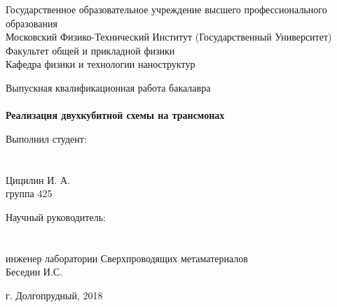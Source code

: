 \documentclass[12pt, a4paper, openany]{book}
\begin{document}
\begin{titlepage}
	\begin{center}
Государственное образовательное учреждение высшего профессионального образования\\
Московский Физико-Технический Институт (Государственный Университет)\\
Факультет общей и прикладной физики\\
Кафедра физики и технологии наноструктур\\
	\end{center}

\vspace{5cm}
	\begin{center}
Выпускная квалификационная работа бакалавра\\~\\
\Large \textbf{Реализация двухкубитной схемы на трансмонах}
	\end{center}

\vspace{4cm}

	\begin{center}
		\begin{minipage}{0.45\textwidth}
			\begin{center}
Выполнил студент:\\~\\~\\
Цицилин И. А.\\
группа 425
			\end{center}
		\end{minipage}
		\begin{minipage}{0.45\textwidth}
			\begin{center}
Научный руководитель:\\~\\~\\
инженер лаборатории Сверхпроводящих метаматериалов\\
Беседин И.С.
			\end{center}
		\end{minipage}
	\end{center}

\vspace{\fill}


	\begin{center}
г. Долгопрудный, 2018
	\end{center}

\end{titlepage}

\end{document}
